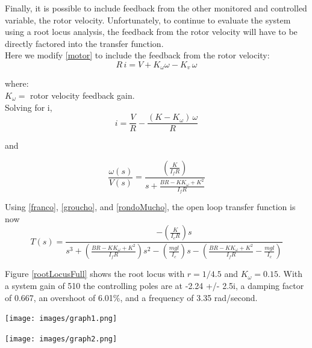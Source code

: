 \documentclass[12pt,letterpaper]{article}
\begin{document}
Finally, it is possible to include feedback from the other monitored and controlled variable, the rotor velocity.
Unfortunately, to continue to evaluate the system using a root locus analysis, the feedback from
the rotor velocity will have to be directly factored into the transfer function.  \\

Here we modify \eqref{motor} to include the feedback from the rotor velocity:
\begin{equation}
    R \,i = V +K_{\omega}\omega - K_{v} \, \omega \label{motorUpdated}
\end{equation}

where: \\
$ K_{\omega} =$ rotor velocity feedback gain.\\

Solving for i,
\begin{equation}
    i = \frac{V}{R} - \frac{(K-K_{\omega}) \, \omega}{R}
\end{equation}

and

\begin{equation}
    \frac{\omega(s)}{V(s)} =  \frac{\left(\frac{K} {I_{f}R}\right)}{s + \frac{B R -K K_{\omega} +K^2}{I_{f}R }}
    \label{rondoMucho}
\end{equation} 

Using \eqref{franco}, \eqref{groucho}, and \eqref{rondoMucho}, the open loop transfer function is now
\begin{equation}
	T(s) =\frac{-(\frac{K} {I_{c}R})s}
	{s^3 + (\frac{BR-K K_{\omega}+K^2}{I_{f}R})s^2 - (\frac{m g l}{I_{c}})s - (\frac{BR-K K_{\omega}+K^2}{I_{f}R} - \frac{m g l}{I_{c}})}
\end{equation}

Figure \ref{rootLocusFull} shows the root locus with $r = 1/4.5$ and $K_{\omega} = 0.15$.  With a system gain of 510 the controlling poles are at -2.24 +/- 2.5i, a damping factor of 0.667, an overshoot of 6.01\%, and 
a frequency of 3.35 rad/second.

\texttt{[image: images/graph1.png]} 
    \label{schematic}

\texttt{[image: images/graph2.png]} 
    \label{modifiedSchematic}
\end{document}
